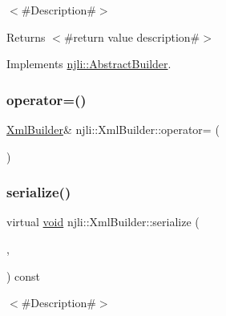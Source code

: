 $<$\#\+Description\#$>$

\begin{DoxyReturn}{Returns}
$<$\#return value description\#$>$ 
\end{DoxyReturn}


Implements \mbox{\hyperlink{classnjli_1_1_abstract_builder_a3e6e553e06d1ca30517ad5fb0bd4d000}{njli\+::\+Abstract\+Builder}}.

\mbox{\label{classnjli_1_1_xml_builder_aced0185f989f50ba3dcfdea93818dcd2}} 
\subsubsection{\texorpdfstring{operator=()}{operator=()}}
{\footnotesize\ttfamily \mbox{\hyperlink{classnjli_1_1_xml_builder}{Xml\+Builder}}\& njli\+::\+Xml\+Builder\+::operator= (\begin{DoxyParamCaption}\item[{const \mbox{\hyperlink{classnjli_1_1_xml_builder}{Xml\+Builder}} \&}]{ }\end{DoxyParamCaption})\hspace{0.3cm}{\ttfamily [protected]}}

\mbox{\label{classnjli_1_1_xml_builder_acddd1c911701604cf5f7ea135243f182}} 
\subsubsection{\texorpdfstring{serialize()}{serialize()}}
{\footnotesize\ttfamily virtual \mbox{\hyperlink{_thread_8h_af1e856da2e658414cb2456cb6f7ebc66}{void}} njli\+::\+Xml\+Builder\+::serialize (\begin{DoxyParamCaption}\item[{\mbox{\hyperlink{_thread_8h_af1e856da2e658414cb2456cb6f7ebc66}{void}} $\ast$}]{,  }\item[{bt\+Serializer $\ast$}]{ }\end{DoxyParamCaption}) const\hspace{0.3cm}{\ttfamily [virtual]}}

$<$\#\+Description\#$>$


